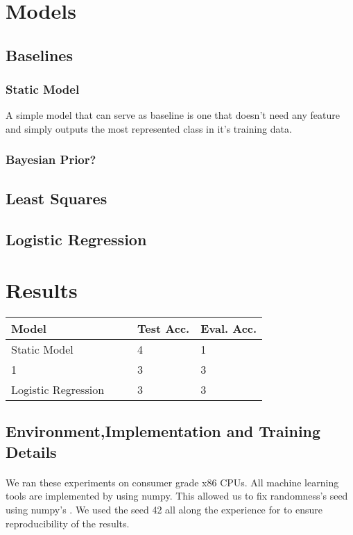 \documentclass[sigconf, nonacm]{acmart}
\begin{document}
\section{Models}
\subsection{Baselines}
\subsubsection{Static Model} A simple model that can serve as baseline is one that doesn't need any feature and simply outputs the most represented class in it's training data.
\subsubsection{Bayesian Prior?}%
\subsection{Least Squares}
\subsection{Logistic Regression}



\section{Results}
\begin{table}[]
	\begin{tabular}{lllll}
		\hline
		Model&  &  & Test Acc. &Eval. Acc.  \\ \hline
		Static Model&  &  & 4 &1  \\ \hline
		1&  &  &3  & 3 \\
		Logistic Regression&  &  &  3&3  \\ \hline
	\end{tabular}
\end{table}
\subsection{Environment,Implementation and Training Details}
\paragraph{}We ran these experiments on consumer grade x86 CPUs. All machine learning tools are implemented by using numpy. This allowed us to fix randomness's seed using numpy's . We used the seed 42 all along the experience for to ensure reproducibility of the results. 
\end{document}
